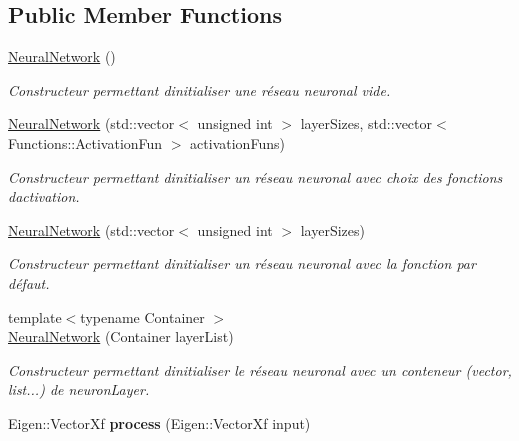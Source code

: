 \subsection*{Public Member Functions}
\begin{DoxyCompactItemize}
\item 
\mbox{\label{classNeuralNetwork_accce4a7728e89a009a9d4ca1758c9b9d}} 
\hyperlink{classNeuralNetwork_accce4a7728e89a009a9d4ca1758c9b9d}{Neural\+Network} ()
\begin{DoxyCompactList}\small\item\em Constructeur permettant d\textquotesingle{}initialiser une réseau neuronal vide. \end{DoxyCompactList}\item 
\hyperlink{classNeuralNetwork_a85cd20f411e96dfd28954fcda39badb7}{Neural\+Network} (std\+::vector$<$ unsigned int $>$ layer\+Sizes, std\+::vector$<$ Functions\+::\+Activation\+Fun $>$ activation\+Funs)
\begin{DoxyCompactList}\small\item\em Constructeur permettant d\textquotesingle{}initialiser un réseau neuronal avec choix des fonctions d\textquotesingle{}activation. \end{DoxyCompactList}\item 
\hyperlink{classNeuralNetwork_ab4015471a72a3d00b6bcabf156526f7b}{Neural\+Network} (std\+::vector$<$ unsigned int $>$ layer\+Sizes)
\begin{DoxyCompactList}\small\item\em Constructeur permettant d\textquotesingle{}initialiser un réseau neuronal avec la fonction par défaut. \end{DoxyCompactList}\item 
{\footnotesize template$<$typename Container $>$ }\\\hyperlink{classNeuralNetwork_a7943bb4e9cb96aae048b236d4f1dd979}{Neural\+Network} (Container layer\+List)
\begin{DoxyCompactList}\small\item\em Constructeur permettant d\textquotesingle{}initialiser le réseau neuronal avec un conteneur (vector, list...) de neuron\+Layer. \end{DoxyCompactList}\item 
\mbox{\label{classNeuralNetwork_a98cab3b3726fbf06dca316068c29c783}} 
Eigen\+::\+Vector\+Xf {\bfseries process} (Eigen\+::\+Vector\+Xf input)
\end{DoxyCompactItemize}

